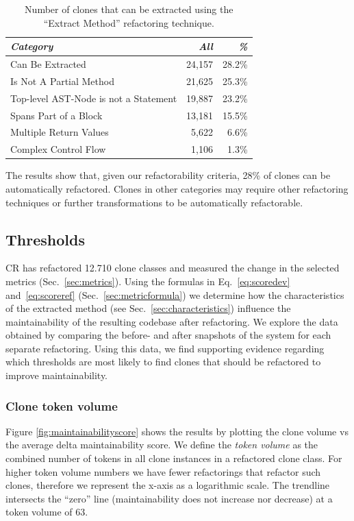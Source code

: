 \documentclass[sigconf,review,anonymous]{acmart}
\begin{document}
\begin{table}
\centering
\begin{tabular}{@{}lrr@{}}
\toprule
\textit{\textbf{Category}} & \textit{\textbf{All}} & \textit{\textbf{\%}} \\ \midrule
Can Be Extracted & 24,157 & 28.2\%  \\
Is Not A Partial Method & 21,625 & 25.3\% \\
Top-level AST-Node is not a Statement & 19,887 & 23.2\% \\
Spans Part of a Block & 13,181 & 15.5\%  \\
Multiple Return Values & 5,622 & 6.6\%  \\
Complex Control Flow & 1,106 & 1.3\% \\
\end{tabular}
\caption{Number of clones that can be extracted using the ``Extract Method'' refactoring technique.}
\label{tab:refactorability}
\end{table}

The results show that, given our refactorability criteria, 28\% of clones can be automatically refactored. Clones in other categories may require other refactoring techniques or further transformations to be automatically refactorable.

\subsection{Thresholds}
CR has refactored 12.710 clone classes and measured the change in the selected metrics (Sec.~\ref{sec:metrics}). %
Using the formulas in Eq.~\ref{eq:scoredev} and~\ref{eq:scoreref} (Sec.~\ref{sec:metricformula}) we determine how the characteristics of the extracted method (see Sec.~\ref{sec:characteristics}) influence the maintainability of the resulting codebase after refactoring. We explore the data obtained by comparing the before- and after snapshots of the system for each separate refactoring. Using this data, we find supporting evidence regarding which thresholds are most likely to find clones that should be refactored to improve maintainability.

\subsubsection{Clone token volume} \label{sec:clonetokenvolume}
Figure \ref{fig:maintainabilityscore} shows the results by plotting the clone volume vs the average delta maintainability score. We define the \textit{token volume} as the combined number of tokens in all clone instances in a refactored clone class. For higher token volume numbers we have fewer refactorings that refactor such clones, therefore we represent the x-axis as a logarithmic scale. The trendline intersects the ``zero'' line (maintainability does not increase nor decrease) at a token volume of 63.
\end{document}
